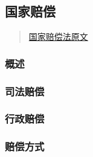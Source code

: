 \subsection{国家赔偿}

\begin{quote}
    \href{https://www.gjxfj.gov.cn/gjxfj/xxgk/fgwj/flfg/webinfo/2016/03/1460585589927542.htm}{国家赔偿法原文}
\end{quote}

\subsubsection{概述}

\subsubsection{司法赔偿}

\subsubsection{行政赔偿}

\subsubsection{赔偿方式}